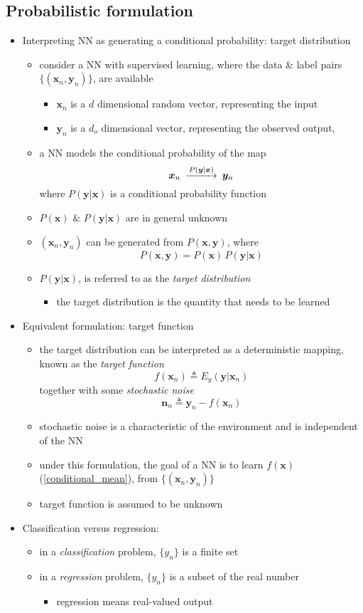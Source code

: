 \documentclass[onecolumn]{IEEEtran}
\newcommand{\beq}{\begin{equation}}
\newcommand{\eeq}{\end{equation}}
\newcommand{\bi}{\begin{itemize}}
\newcommand{\ei}{\end{itemize}}
\begin{document}
\subsection{Probabilistic formulation\label{prob_sec}}
\begin{itemize}
    \item Interpreting NN as generating a conditional probability: target distribution
    \bi
        \item consider a NN with supervised learning, where the data \& label pairs $\{(\bm{x}_n,\bm{y}_n)\}$, are available
        \bi
             \item $\bm{x}_n$ is a $d$ dimensional random vector, representing the input
             \item $\bm{y}_n$ is a $d_o$ dimensional vector, representing the observed output,
        \ei
        \item a NN models the conditional probability of the map
        \beq\label{input_output}\begin{CD}
            \bm{x}_n  @>P(\bm{y}|\bm{x})>> \bm{y}_n
        \end{CD}\eeq
        where $P(\bm{y}|\bm{x})$ is a conditional probability function
        \item $P(\bm{x})$ \& $P(\bm{y}|\bm{x})$ are in general unknown
        \item $(\bm{x}_n,\bm{y}_n)$ can be generated from $P(\bm{x},\bm{y})$, where
        \beq
            P(\bm{x},\bm{y}) = P(\bm{x})\, P(\bm{y}|\bm{x})
        \eeq
        \item $P(\bm{y}|\bm{x})$, is referred to as the \emph{target distribution}
        \bi
            \item the target distribution is the quantity that needs to be learned
        \ei
    \ei
    \item Equivalent formulation: target function
    \bi
        \item the target distribution can be interpreted as a deterministic mapping, known as the \emph{target function}
        \beq\label{conditional_mean}
            f(\bm{x}_n) \triangleq E_{y}(\bm{y}|\bm{x}_n)
        \eeq
        together with some \emph{stochastic noise}
        \beq\label{noise_def}
            \bm{n}_n \triangleq \bm{y}_n - f(\bm{x}_n)
        \eeq
        \item stochastic noise is a characteristic of the environment and is independent of the NN
        \item under this formulation,  the goal of a NN is to learn $f(\bm{x})$ (\ref{conditional_mean}), from $\{(\bm{x}_n,\bm{y}_n)\}$
        \item target function is assumed to be unknown
    \ei
    \item Classification versus regression:
    \bi
        \item in a \emph{classification} problem, $\{y_n\}$ is a finite set
        \item in a \emph{regression} problem, $\{y_n\}$ is a subset of the real number
        \bi
            \item regression means real-valued output
        \ei
    \ei
 \end{itemize}
\end{document}
